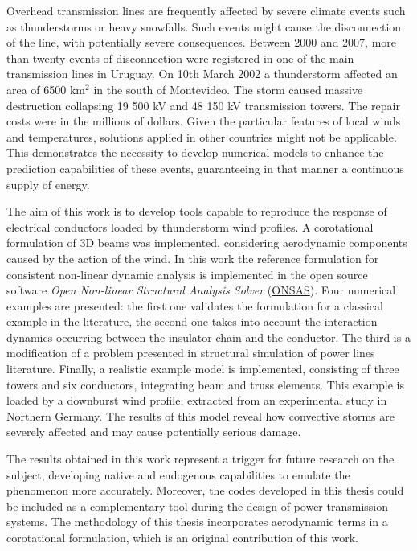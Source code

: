 \begin{foreignabstract}
Overhead transmission lines are frequently affected by severe climate events such as thunderstorms or heavy snowfalls. Such events might cause the disconnection of the line, with potentially severe consequences. Between 2000 and 2007, more than twenty events of disconnection were registered in one of the main transmission lines in Uruguay. On 10th March 2002 a thunderstorm affected an area of 6500 km$^2$ in the south of Montevideo. The storm caused massive destruction collapsing 19 500 kV and 48 150 kV transmission towers. The repair costs were in the millions of dollars. Given the particular features of local winds and temperatures, solutions applied in other countries might not be applicable. This demonstrates the necessity to develop numerical models to enhance the prediction capabilities of these events, guaranteeing in that manner a continuous supply of energy.

The aim of this work is to develop tools capable to reproduce the response of electrical conductors loaded by  thunderstorm wind profiles. A corotational formulation of 3D beams was implemented, considering aerodynamic components caused by the action of the wind. In this work the reference formulation for consistent non-linear dynamic analysis is implemented in the open source software \emph{Open Non-linear Structural Analysis Solver} (\href{https://github.com/ONSAS/ONSAS.m/}{ONSAS}). Four numerical examples are presented: the first one validates the formulation for a classical example in the literature, the second one takes into account the interaction dynamics occurring between the insulator chain and the conductor. The third is a modification of a problem presented in structural simulation of power lines literature.  Finally, a realistic example model is implemented, consisting of three towers and six conductors, integrating beam and truss elements. This example is loaded by a downburst wind profile,  extracted from an experimental study in Northern Germany. The results of this model reveal how convective storms are severely affected and may cause potentially serious damage.

The results obtained in this work represent a trigger for future research on the subject, developing native and endogenous capabilities to emulate the phenomenon more accurately. Moreover, the codes developed in this thesis could be included as a complementary tool during the design of power transmission systems. The methodology of this thesis incorporates aerodynamic terms in a corotational formulation, which is an original contribution of this work.  

\end{foreignabstract}